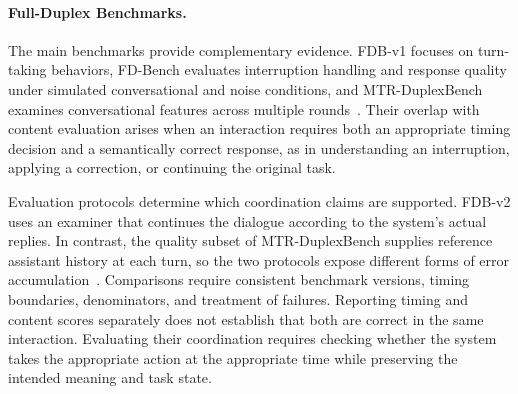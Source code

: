 \paragraph{Full-Duplex Benchmarks.}
The main benchmarks provide complementary evidence. FDB-v1 focuses on turn-taking behaviors, FD-Bench evaluates interruption handling and response quality under simulated conversational and noise conditions, and MTR-DuplexBench examines conversational features across multiple rounds~\citep{DBLP:conf/asru/LinLLWALL25,DBLP:conf/interspeech/PengCNMN0C25,DBLP:conf/acl/HeCXLZBMK26}. Their overlap with content evaluation arises when an interaction requires both an appropriate timing decision and a semantically correct response, as in understanding an interruption, applying a correction, or continuing the original task.

Evaluation protocols determine which coordination claims are supported. FDB-v2 uses an examiner that continues the dialogue according to the system's actual replies. In contrast, the quality subset of MTR-DuplexBench supplies reference assistant history at each turn, so the two protocols expose different forms of error accumulation~\citep{DBLP:conf/acl/LinKSCAWL26,DBLP:conf/acl/HeCXLZBMK26}. Comparisons require consistent benchmark versions, timing boundaries, denominators, and treatment of failures. Reporting timing and content scores separately does not establish that both are correct in the same interaction. Evaluating their coordination requires checking whether the system takes the appropriate action at the appropriate time while preserving the intended meaning and task state.


% 



